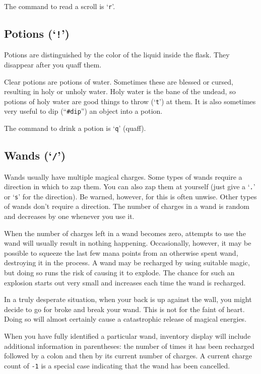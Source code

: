 The command to read a scroll is `{\tt r}'.

\subsection*{Potions (`{\tt !}')}

Potions are distinguished by the color of the liquid inside the flask.
They disappear after you quaff them.

Clear potions are potions of water.  Sometimes these are
blessed or cursed, resulting in holy or unholy water.  Holy water is
the bane of the undead, so potions of holy water are good things to
throw (`{\tt t}') at them.  It is also sometimes very useful to dip
(``{\tt \#dip}'') an object into a potion.

The command to drink a potion is `{\tt q}' (quaff).

\subsection*{Wands (`{\tt /}')}

Wands usually have multiple magical charges.
Some types of wands require a direction in which to zap them.
You can also
zap them at yourself (just give a `{\tt .}' or `{\tt s}' for the direction).
Be warned, however, for this is often unwise.
Other types of wands
don't require a direction.  The number of charges in a
wand is random and decreases by one whenever you use it.

When the number of charges left in a wand becomes zero, attempts to use the
wand will usually result in nothing happening.  Occasionally, however, it may
be possible to squeeze the last few mana points from an otherwise spent wand,
destroying it in the process.  A wand may be recharged by using suitable
magic, but doing so runs the risk of causing it to explode.  The chance
for such an explosion starts out very small and increases each time the
wand is recharged.

In a truly desperate situation, when your back is up against the wall, you
might decide to go for broke and break your wand.  This is not for the faint
of heart.  Doing so will almost certainly cause a catastrophic release of
magical energies.

When you have fully identified a particular wand, inventory display will
include additional information in parentheses: the number of times it has
been recharged followed by a colon and then by its current number of charges.
A current charge count of {\tt -1} is a special case indicating that the wand
has been cancelled.

